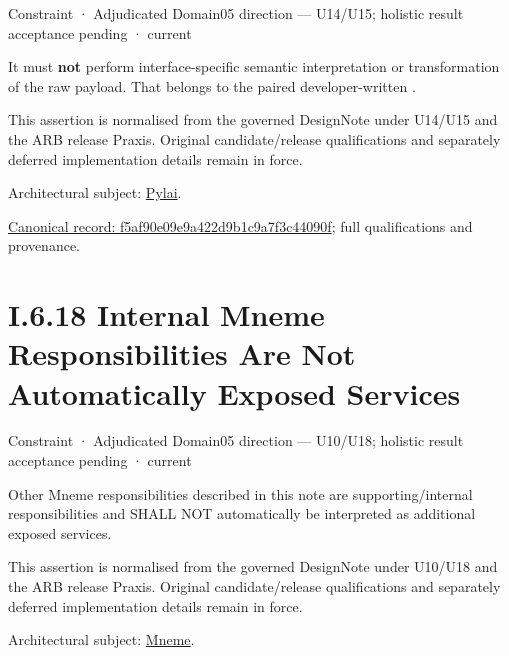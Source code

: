 \label{element:f5af90e09e9a422d9b1c9a7f3c44090f}
{\small Constraint · Adjudicated Domain05 direction — U14/U15; holistic result acceptance pending · current}\par

It must \textbf{not} perform interface-specific semantic interpretation or transformation of the raw payload. That belongs to the paired developer-written \texttt{}.



This assertion is normalised from the governed DesignNote under U14/U15 and the ARB release Praxis. Original candidate/release qualifications and separately deferred implementation details remain in force.



Architectural subject: \hyperref[element:e3e4147fea3640198dc251ed41ee854d]{Pylai}.


{\footnotesize \href{../../../../../../../../continuum/motivation/constraint/f5af90e09e9a422d9b1c9a7f3c44090f.md}{Canonical record: f5af90e09e9a422d9b1c9a7f3c44090f}; full qualifications and provenance.}\par
\section*{I.6.18 Internal Mneme Responsibilities Are Not Automatically Exposed Services}
\label{navigation:I.6.18}

\label{element:f0a85fcf515946e2b7c88543061ebac1}
{\small Constraint · Adjudicated Domain05 direction — U10/U18; holistic result acceptance pending · current}\par

Other Mneme responsibilities described in this note are supporting/internal responsibilities and SHALL NOT automatically be interpreted as additional exposed services.



This assertion is normalised from the governed DesignNote under U10/U18 and the ARB release Praxis. Original candidate/release qualifications and separately deferred implementation details remain in force.



Architectural subject: \hyperref[element:1af8a56358f7429fabfb57be66542a99]{Mneme}.


